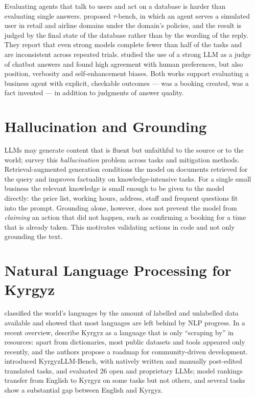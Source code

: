 Evaluating agents that talk to users and act on a database is harder than evaluating single answers.
\textcite{yao2024taubench} proposed $\tau$-bench, in which an agent serves a simulated user in retail and airline domains
under the domain's policies, and the result is judged by the final state of the database rather than by the wording of
the reply. They report that even strong models complete fewer than half of the tasks and are inconsistent across
repeated trials. \textcite{zheng2023judging} studied the use of a strong LLM as a judge of chatbot answers and found high
agreement with human preferences, but also position, verbosity and self-enhancement biases. Both works support evaluating
a business agent with explicit, checkable outcomes --- was a booking created, was a fact invented --- in addition to
judgments of answer quality.

\section{Hallucination and Grounding}

LLMs may generate content that is fluent but unfaithful to the source or to the world; \textcite{ji2023survey} survey this
\emph{hallucination} problem across tasks and mitigation methods. Retrieval-augmented generation
\parencite{lewis2020retrieval} conditions the model on documents retrieved for the query and improves factuality on
knowledge-intensive tasks. For a single small business the relevant knowledge is small enough to be given to the model
directly: the price list, working hours, address, staff and frequent questions fit into the prompt. Grounding alone,
however, does not prevent the model from \emph{claiming} an action that did not happen, such as confirming a booking
for a time that is already taken. This motivates validating actions in code and not only grounding the text.

\section{Natural Language Processing for Kyrgyz}

\textcite{joshi2020state} classified the world's languages by the amount of labelled and unlabelled data available and
showed that most languages are left behind by NLP progress. In a recent overview, \textcite{alekseev2024kyrgyznlp}
describe Kyrgyz as a language that is only \enquote{scraping by} in resources: apart from dictionaries, most public
datasets and tools appeared only recently, and the authors propose a roadmap for community-driven development.
\textcite{turatali2026kyrgyzllmbench} introduced KyrgyzLLM-Bench, with natively written and manually post-edited
translated tasks, and evaluated 26 open and proprietary LLMs; model rankings transfer from English to Kyrgyz on some tasks
but not others, and several tasks show a substantial gap between English and Kyrgyz.

